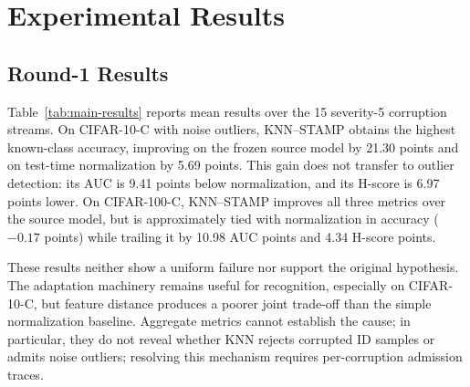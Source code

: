 \section{Experimental Results}

\subsection{Round-1 Results}
Table~\ref{tab:main-results} reports mean results over the 15
severity-5 corruption streams. On CIFAR-10-C with noise outliers, KNN--STAMP
obtains the highest known-class accuracy, improving on the frozen source model
by 21.30 points and on test-time normalization by 5.69 points. This gain does
not transfer to outlier detection: its AUC is 9.41 points below normalization,
and its H-score is 6.97 points lower. On CIFAR-100-C, KNN--STAMP improves all
three metrics over the source model, but is approximately tied with
normalization in accuracy ($-0.17$ points) while trailing it by 10.98 AUC points
and 4.34 H-score points.

These results neither show a uniform failure nor support the original
hypothesis. The adaptation machinery remains useful for recognition, especially
on CIFAR-10-C, but feature distance produces a poorer joint trade-off than the
simple normalization baseline. Aggregate metrics cannot establish the cause;
in particular, they do not reveal whether KNN rejects corrupted ID samples or
admits noise outliers; resolving this mechanism requires per-corruption
admission traces.

